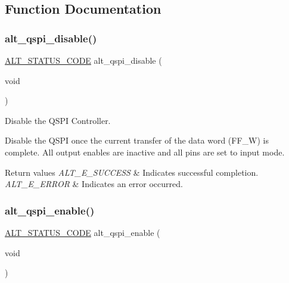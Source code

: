 \subsection{Function Documentation}
\mbox{\label{group__ALT__QSPI__CSR_ga22df5a849bd115eef330974c03734fc1}} 
\subsubsection{\texorpdfstring{alt\_qspi\_disable()}{alt\_qspi\_disable()}}
{\footnotesize\ttfamily \mbox{\hyperlink{hwlib_8h_abdb0d369f069723ca55d6c94bcaaaa12}{A\+L\+T\+\_\+\+S\+T\+A\+T\+U\+S\+\_\+\+C\+O\+DE}} alt\+\_\+qspi\+\_\+disable (\begin{DoxyParamCaption}\item[{void}]{ }\end{DoxyParamCaption})}

Disable the Q\+S\+PI Controller.

Disable the Q\+S\+PI once the current transfer of the data word (F\+F\+\_\+W) is complete. All output enables are inactive and all pins are set to input mode.


\begin{DoxyRetVals}{Return values}
{\em A\+L\+T\+\_\+\+E\+\_\+\+S\+U\+C\+C\+E\+SS} & Indicates successful completion. \\
\hline
{\em A\+L\+T\+\_\+\+E\+\_\+\+E\+R\+R\+OR} & Indicates an error occurred. \\
\hline
\end{DoxyRetVals}
\mbox{\label{group__ALT__QSPI__CSR_ga68501b9717901e2d160297a802728772}} 
\subsubsection{\texorpdfstring{alt\_qspi\_enable()}{alt\_qspi\_enable()}}
{\footnotesize\ttfamily \mbox{\hyperlink{hwlib_8h_abdb0d369f069723ca55d6c94bcaaaa12}{A\+L\+T\+\_\+\+S\+T\+A\+T\+U\+S\+\_\+\+C\+O\+DE}} alt\+\_\+qspi\+\_\+enable (\begin{DoxyParamCaption}\item[{void}]{ }\end{DoxyParamCaption})}

